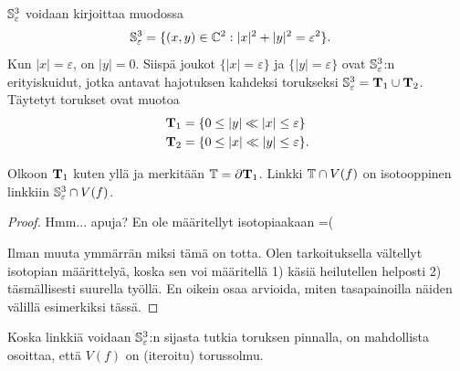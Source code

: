 $\S_\varepsilon^3$ voidaan kirjoittaa muodossa
\begin{align*}
    \S_\varepsilon^3&=\{(x,y)\in\C^2:|x|^2+|y|^2=\varepsilon^2\}.
\end{align*}
Kun $|x|=\varepsilon$, on $|y|=0$. Siispä joukot $\{|x|=\varepsilon\}$ ja $\{|y|=\varepsilon\}$ ovat $\S_\varepsilon^3$:n erityiskuidut, jotka antavat hajotuksen kahdeksi torukseksi $\S_\varepsilon^3=\TT_1\cup\TT_2$. Täytetyt torukset ovat muotoa
\begin{align*}
    \TT_1&=\{0\leq|y|\ll|x|\leq\varepsilon\} \\
    \TT_2&=\{0\leq|x|\ll|y|\leq\varepsilon\}.
\end{align*}
\begin{lemma}
    \label{lemma:3-pallo-linkki-isotooppinen-torussolmulinkkiin}
    Olkoon $\TT_1$ kuten yllä ja merkitään $\T=\partial\TT_1$. Linkki $\T\cap V(f)$ on isotooppinen linkkiin $\S_\varepsilon^3\cap V(f)$.
\end{lemma}
\begin{proof}
    Hmm... apuja? En ole määritellyt isotopiaakaan =(

    Ilman muuta ymmärrän miksi tämä on totta. Olen tarkoituksella vältellyt isotopian määrittelyä, koska sen voi määritellä 1) käsiä heilutellen helposti 2) täsmällisesti suurella työllä. En oikein osaa arvioida, miten tasapainoilla näiden välillä esimerkiksi tässä.
\end{proof}
Koska linkkiä voidaan $\S_\varepsilon^3$:n sijasta tutkia toruksen pinnalla, on mahdollista osoittaa, että $V(f)$ on (iteroitu) torussolmu. 
